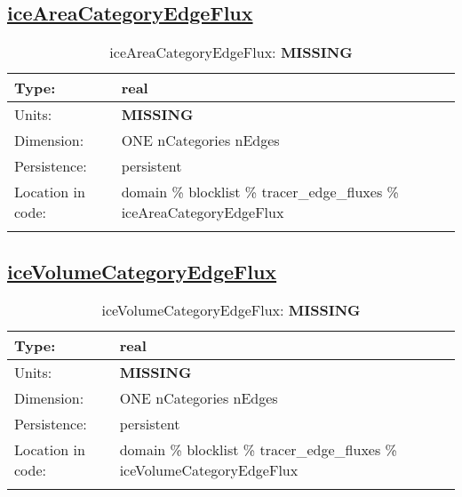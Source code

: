 \subsection[iceAreaCategoryEdgeFlux]{\hyperref[sec:var_tab_tracer_edge_fluxes]{iceAreaCategoryEdgeFlux}}
\label{subsec:var_sec_tracer_edge_fluxes_iceAreaCategoryEdgeFlux}
\begin{center}
\begin{longtable}{| p{2.0in} | p{4.0in} |}
        \hline 
        Type: & real \\
        \hline 
        Units: & {\bf \color{red} MISSING} \\
        \hline 
        Dimension: & ONE nCategories nEdges \\
        \hline 
        Persistence: & persistent \\
        \hline 
         Location in code: & domain \% blocklist \% tracer\_edge\_fluxes \% iceAreaCategoryEdgeFlux \\
         \hline 
    \caption{iceAreaCategoryEdgeFlux: {\bf \color{red} MISSING}}
\end{longtable}
\end{center}
\subsection[iceVolumeCategoryEdgeFlux]{\hyperref[sec:var_tab_tracer_edge_fluxes]{iceVolumeCategoryEdgeFlux}}
\label{subsec:var_sec_tracer_edge_fluxes_iceVolumeCategoryEdgeFlux}
\begin{center}
\begin{longtable}{| p{2.0in} | p{4.0in} |}
        \hline 
        Type: & real \\
        \hline 
        Units: & {\bf \color{red} MISSING} \\
        \hline 
        Dimension: & ONE nCategories nEdges \\
        \hline 
        Persistence: & persistent \\
        \hline 
         Location in code: & domain \% blocklist \% tracer\_edge\_fluxes \% iceVolumeCategoryEdgeFlux \\
         \hline 
    \caption{iceVolumeCategoryEdgeFlux: {\bf \color{red} MISSING}}
\end{longtable}
\end{center}
